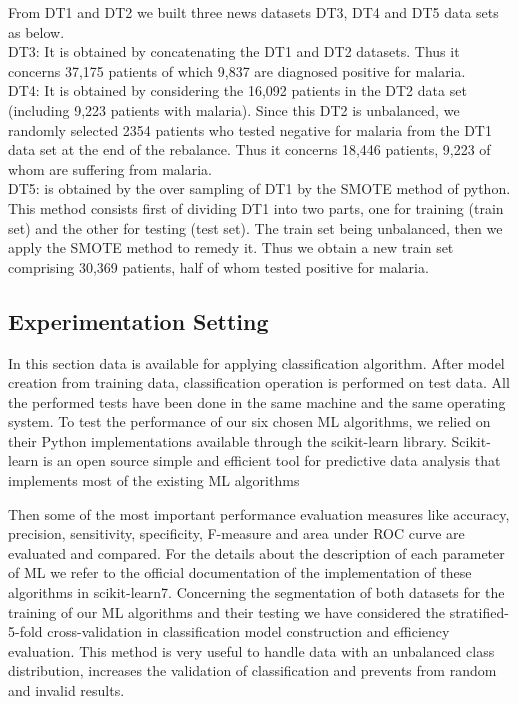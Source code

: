 From DT1 and DT2 we built three news datasets DT3, DT4 and DT5 data sets as below.\\
 DT3: It is obtained by concatenating the DT1 and DT2 datasets. Thus it concerns 37,175 patients of which 9,837 are diagnosed positive for malaria.\\
DT4: It is obtained by considering the 16,092 patients in the DT2 data set (including 9,223 patients with malaria). Since this DT2 is unbalanced, we randomly selected 2354 patients who tested negative for malaria from the DT1 data set at the end of the rebalance. Thus it concerns 18,446 patients, 9,223 of whom are suffering from malaria.\\
DT5: is obtained by the over sampling of DT1 by the SMOTE method of python. This method consists first of dividing DT1 into two parts, one for training (train set) and the other for testing (test set). The train set being unbalanced, then we apply the SMOTE method to remedy it. Thus we obtain a new train set comprising 30,369 patients, half of whom tested positive for malaria.
\subsection{Experimentation Setting}
In this section data is available for applying classification algorithm. After model creation from training data, classification operation is performed on test data. 
All the performed tests have been done in the same machine and the same operating system. To test the performance of our six chosen ML algorithms, we relied on their Python implementations available through the scikit-learn library. Scikit-learn is an open source simple and efficient tool for predictive data analysis that implements most of the existing ML algorithms

Then some of the most important performance evaluation measures like accuracy, precision, sensitivity, specificity, F-measure and area under ROC curve are evaluated and compared. 
For the details about the description of each parameter of ML we refer to the official documentation of the implementation of these algorithms in scikit-learn7. Concerning the segmentation of both datasets for the training of our ML algorithms and their testing we have considered the stratified-5-fold cross-validation in classification model construction and efficiency evaluation. This method is very useful to handle data with an unbalanced class distribution, increases the validation of classification and prevents from random and invalid results.


